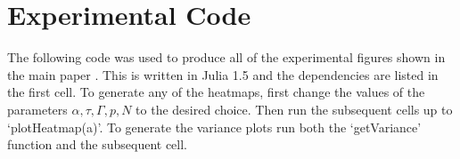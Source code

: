 \documentclass{article}
\begin{document}
\section{Experimental Code}

The following code was used to produce all of the experimental figures shown in the main paper \cite{MainPaper}. This is written in Julia 1.5 and the dependencies are listed in the first cell. To generate any of the heatmaps, first change the values of the parameters $\alpha, \tau, \Gamma, p, N$ to the desired choice. Then run the subsequent cells up to `plotHeatmap(a)'. To generate the variance plots run both the `getVariance' function and the subsequent cell.



 

\end{document}
